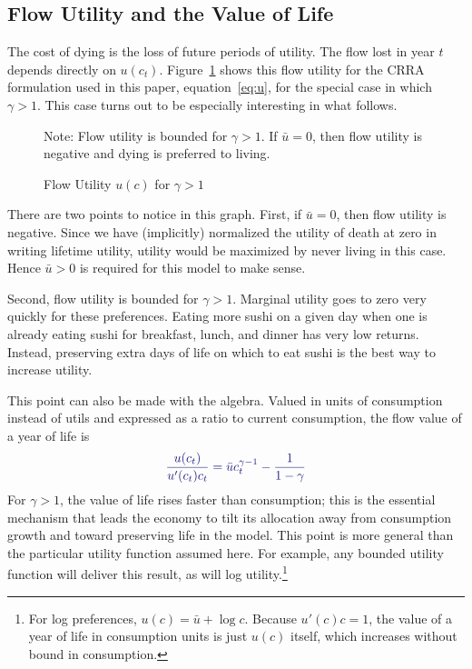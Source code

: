 \documentclass[12pt,twoside]{article}
\newcommand{\fignote}[2]{\begin{center}\parbox[c]{#1}{\footnotesize #2} \end{center}}
\newcommand{\clr}[1]{{\color{ChadBlue} #1}}
\begin{document}
\subsection{Flow Utility and the Value of Life}

The cost of dying is the loss of future periods of utility. The flow
lost in year $t$ depends directly on $u(c_t)$. Figure~\ref{fig:u} shows
this flow utility for the CRRA formulation used in this paper,
equation~\eqref{eq:u}, for the special case in which $\gamma>1$.  This
case turns out to be especially interesting in what follows.
\begin{figure}[tp]
\caption{Flow Utility $u(c)$ for $\gamma>1$}
\label{fig:u}
\fignote{4.5in}{Note: Flow utility is bounded for $\gamma>1$. If
  $\bar{u}=0$, then flow utility is negative and dying is
  preferred to living.}
\end{figure} 
There are two points to notice in this graph. First, if $\bar{u}=0$,
then flow utility is negative. Since we have (implicitly) normalized the
utility of death at zero in writing lifetime utility, utility would be
maximized by never living in this case. Hence $\bar{u}>0$ is required
for this model to make sense.

Second, flow utility is bounded for $\gamma>1$. Marginal utility goes to
zero very quickly for these preferences. Eating more sushi on a given
day when one is already eating sushi for breakfast, lunch, and dinner
has very low returns. Instead, preserving extra days of life on which to
eat sushi is the best way to increase utility.

This point can also be made with the algebra. Valued in units of
consumption instead of utils and expressed as a ratio to current
consumption, the flow value of a year of life is
\begin{equation}
 \clr{ \frac{u(c_t)}{u'(c_t) c_t} = \bar{u} c_t ^{\gamma-1} -
   \frac{1}{1-\gamma} }
\end{equation}
For $\gamma>1$, the value of life rises faster than consumption; this is
the essential mechanism that leads the economy to tilt its allocation
away from consumption growth and toward preserving life in the model.
This point is more general than the particular utility function assumed
here. For example, any bounded utility function will deliver this
result, as will log utility.\footnote{For log preferences,
  $u(c)=\bar{u}+\log c$. Because $u'(c)c=1$, the value of a year of life
  in consumption units is just $u(c)$ itself, which increases without
  bound in consumption.}
\end{document}
